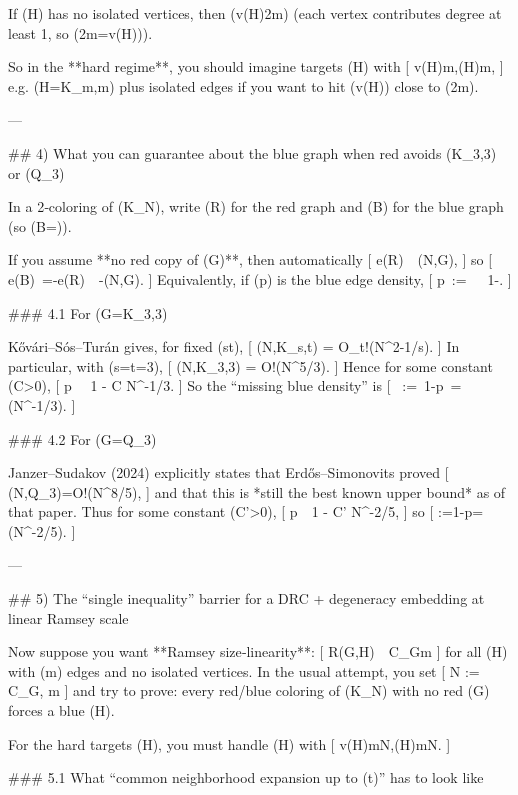 If (H) has no isolated vertices, then (v(H)\le 2m) (each vertex contributes degree at least 1, so (2m=\sum \deg \ge v(H))).

So in the **hard regime**, you should imagine targets (H) with
[
v(H)\asymp m,\qquad {}(H)\asymp \sqrt m,
]
e.g. (H=K_{\lfloor\sqrt m\rfloor,\lfloor\sqrt m\rfloor}) plus isolated edges if you want to hit (v(H)) close to (2m).

---

## 4) What you can guarantee about the blue graph when red avoids (K_{3,3}) or (Q_3)

In a 2‑coloring of (K_N), write (R) for the red graph and (B) for the blue graph (so (B=)).

If you assume **no red copy of (G)**, then automatically
[
e(R)\ \le\ (N,G),
]
so
[
e(B)\ =-e(R)\ \ge\ -(N,G).
]
Equivalently, if (p) is the blue edge density,
[
p\ :=\ \ \ge\ 1-.
]

### 4.1 For (G=K_{3,3})

Kővári–Sós–Turán gives, for fixed (s\le t),
[
(N,K_{s,t}) = O_t!\left(N^{2-1/s}\right).
]
In particular, with (s=t=3),
[
(N,K_{3,3}) = O!\left(N^{5/3}\right).
]
Hence for some constant (C>0),
[
p \ \ge\ 1 - C N^{-1/3}.
]
So the “missing blue density” is
[
\varepsilon\ :=\ 1-p\ =\Theta(N^{-1/3})\quad{}.
]

### 4.2 For (G=Q_3)

Janzer–Sudakov (2024) explicitly states that Erdős–Simonovits proved
[
(N,Q_3)=O!\left(N^{8/5}\right),
]
and that this is *still the best known upper bound* as of that paper.
Thus for some constant (C'>0),
[
p\ \ge\ 1 - C' N^{-2/5},
]
so
[
\varepsilon:=1-p=\Theta(N^{-2/5}).
]

---

## 5) The “single inequality” barrier for a DRC + degeneracy embedding at linear Ramsey scale

Now suppose you want **Ramsey size‑linearity**:
[
R(G,H)\ \le\ C_G\cdot m
]
for all (H) with (m) edges and no isolated vertices. In the usual attempt, you set
[
N := C_G, m
]
and try to prove: every red/blue coloring of (K_N) with no red (G) forces a blue (H).

For the hard targets (H), you must handle (H) with
[
v(H)\asymp m\asymp N,\qquad {}(H)\asymp \sqrt m\asymp \sqrt N.
]

### 5.1 What “common neighborhood expansion up to (t)” has to look like

